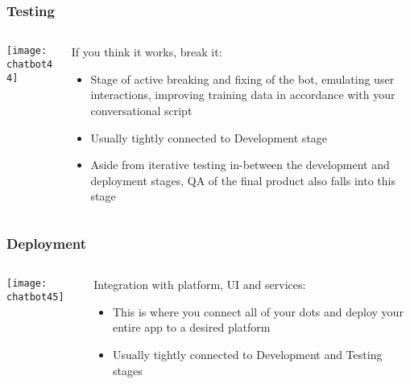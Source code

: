 \begin{frame}[fragile]\frametitle{Testing}
    \begin{columns}
    \begin{column}[t]{0.5\linewidth}
\begin{center}
\texttt{[image: chatbot44]}
\end{center}
\end{column}
    \begin{column}[t]{0.5\linewidth}
If you think it works, break it:

\begin{itemize}
\item Stage of active breaking and fixing of the bot, emulating user interactions, improving training data in accordance with your conversational script
\item Usually tightly connected to Development stage
\item Aside from iterative testing in-between the development and deployment stages, QA of the final product also falls into this stage
\end{itemize}
\end{column}
\end{columns}
\end{frame}

\begin{frame}[fragile]\frametitle{Deployment}
    \begin{columns}
    \begin{column}[t]{0.5\linewidth}
\begin{center}
\texttt{[image: chatbot45]}
\end{center}
\end{column}
    \begin{column}[t]{0.5\linewidth}
Integration with platform, UI and services:
\begin{itemize}
\item This is where you connect all of your dots and deploy your entire app to a desired platform
\item Usually tightly connected to Development and Testing stages
\end{itemize}
\end{column}
\end{columns}
\end{frame}

